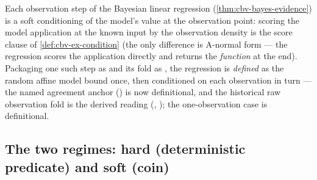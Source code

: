 \begin{lemma}%
\label{lem:cbv-bayes-iter-condition}
\rocqok
{}\rocqok
{}\rocqok
{}\rocqok
{}
Each observation step of the Bayesian linear regression
(\autoref{thm:cbv-bayes-evidence}) is a soft conditioning of the
model's value at the observation point: scoring the model application
at the known input by the observation density is the score clause of
\autoref{def:cbv-ex-condition} (the only difference is A-normal form
--- the regression scores the application directly and returns the
\emph{function} at the end). Packaging one such step as
 and its fold as
, the regression is
\emph{defined} as the random affine model bound once, then
conditioned on each observation in turn --- the named agreement
anchor
()
is now definitional, and the historical raw observation fold is the
derived reading
(,
); the
one-observation case is definitional.
\end{lemma}

\subsection{The two regimes: hard (deterministic predicate) and soft
(coin)}\label{ssec:cbv-hard-reject}

